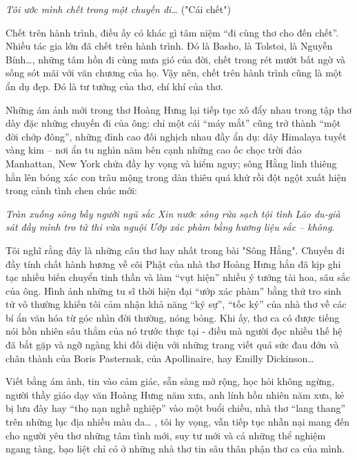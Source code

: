 \documentclass[../main.tex]{subfiles}
\begin{document}
\begin{multicols}{2}
\begin{blockquote}
\textit{Tôi ước mình chết trong một chuyến đi…}        
("Cái chết") 

\end{blockquote}
 
Chết trên hành trình, điều ấy có khác gì tâm niệm “đi cùng thơ cho đến chết”. Nhiều tác gia lớn đã chết trên hành trình. Đó là Basho, là Tolstoi, là Nguyễn Bính…, những tâm hồn đi cùng mưa gió của đời, chết trong rét mướt bất ngờ và sống sót mãi với văn chương của họ. Vậy nên, chết trên hành trình cũng là một ẩn dụ đẹp. Đó là tư tưởng của thơ, chí khí của thơ.  
 
Những ám ảnh mới trong thơ Hoàng Hưng lại tiếp tục xô đẩy nhau trong tập thơ dày đặc những chuyến đi của ông: chỉ một cái “máy mắt” cũng trở thành “một đời chớp đông”, những đỉnh cao đối nghịch nhau đầy ẩn dụ: dãy Himalaya tuyết vàng kim – nơi ẩn tu nghìn năm bên cạnh những cao ốc chọc trời đảo Manhattan, New York chứa đầy hy vọng và hiểm nguy; sông Hằng linh thiêng hằn lên bóng xác con trâu mộng trong dàn thiêu quá khứ rồi đột ngột xuất hiện trong cảnh tình chen chúc mới:        
\begin{blockquote}
        
\textit{Tràn xuống sông bầy người ngũ sắc}        
\textit{Xin nước sông rửa sạch tội tình}        
\textit{Lão du-già sát đầy mình tro tử thi vừa nguội} 
\textit{Ướp xác phàm bằng hương liệu sắc – không.} 

\end{blockquote}
 
Tôi nghĩ rằng đây là những câu thơ hay nhất trong bài "Sông Hằng". Chuyến đi đầy tính chất hành hương về cõi Phật của nhà thơ Hoàng Hưng hẳn đã kịp ghi tạc nhiều biến chuyển tinh thần và làm “vụt hiện” nhiều ý tưởng tài hoa, sâu sắc của ông. Hình ảnh những tu sĩ thời hiện đại “ướp xác phàm” bằng thứ tro sinh tử vô thường khiến tôi cảm nhận khả năng “ký sự”, “tốc ký” của nhà thơ về các bí ẩn văn hóa từ góc nhìn đời thường, nóng bỏng. Khi ấy, thơ ca có được tiếng nói hồn nhiên sâu thẳm của nó trước thực tại - điều mà người đọc nhiều thế hệ đã bắt gặp và ngỡ ngàng khi đối diện với những trang viết quá sức đau đớn và chân thành của Boris Pasternak, của Apollinaire, hay Emilly Dickinson…  
 
Viết bằng ám ảnh, tin vào cảm giác, sẵn sàng mở rộng, học hỏi không ngừng, người thầy giáo dạy văn Hoàng Hưng năm xưa, anh lính hồn nhiên năm xưa, kẻ bị lưu đày hay “thọ nạn nghề nghiệp” vào một buổi chiều, nhà thơ “lang thang” trên những lục địa nhiều màu da… , tôi hy vọng, vẫn tiếp tục nhẫn nại mang đến cho người yêu thơ những tâm tình mới, suy tư mới và cả những thể nghiệm ngang tàng, bạo liệt chỉ có ở những nhà thơ tin sâu thân phận thơ ca của mình.  
 

\end{multicols}
\end{document}
